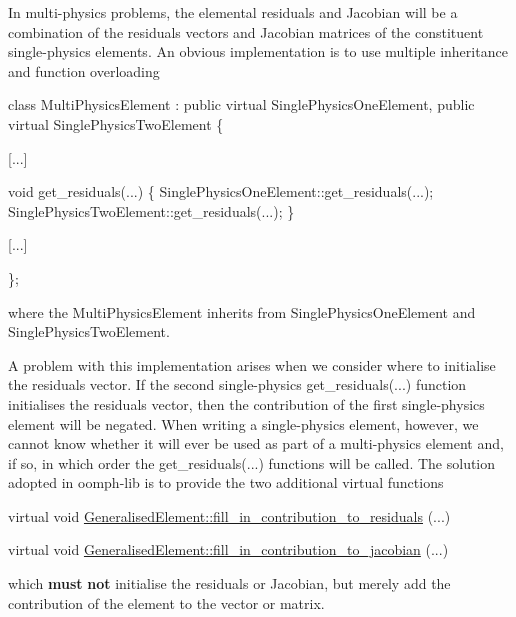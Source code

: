 In multi-\/physics problems, the elemental residuals and Jacobian will be a combination of the residuals vectors and Jacobian matrices of the constituent single-\/physics elements. An obvious implementation is to use multiple inheritance and function overloading 
\begin{DoxyCode}
\textcolor{keyword}{class }MultiPhysicsElement : \textcolor{keyword}{public} \textcolor{keyword}{virtual} SinglePhysicsOneElement,
                            \textcolor{keyword}{public} \textcolor{keyword}{virtual} SinglePhysicsTwoElement
 \{   

  [...]
                     
  \textcolor{keywordtype}{void} get\_residuals(...) 
   \{
    SinglePhysicsOneElement::get\_residuals(...);
    SinglePhysicsTwoElement::get\_residuals(...);
   \}

  [...]

 \};
\end{DoxyCode}
 where the {\ttfamily Multi\+Physics\+Element} inherits from {\ttfamily Single\+Physics\+One\+Element} and {\ttfamily Single\+Physics\+Two\+Element}.

A problem with this implementation arises when we consider where to initialise the residuals vector. If the second single-\/physics {\ttfamily get\+\_\+residuals}(...) function initialises the residuals vector, then the contribution of the first single-\/physics element will be negated. When writing a single-\/physics element, however, we cannot know whether it will ever be used as part of a multi-\/physics element and, if so, in which order the {\ttfamily get\+\_\+residuals}(...) functions will be called. The solution adopted in {\ttfamily oomph-\/lib} is to provide the two additional virtual functions 
\begin{DoxyCode}
\textcolor{keyword}{virtual} \textcolor{keywordtype}{void} \hyperlink{namespaceoomph_a4221193ecad909a3bf5cfcec81202e39}{GeneralisedElement::fill\_in\_contribution\_to\_residuals}
      (...)
\end{DoxyCode}
 
\begin{DoxyCode}
\textcolor{keyword}{virtual} \textcolor{keywordtype}{void} \hyperlink{namespaceoomph_a96a6d71e6bedf75a2fb9051be0644f98}{GeneralisedElement::fill\_in\_contribution\_to\_jacobian}
      (...)
\end{DoxyCode}
 which {\bfseries must} {\bfseries not} initialise the residuals or Jacobian, but merely add the contribution of the element to the vector or matrix.

